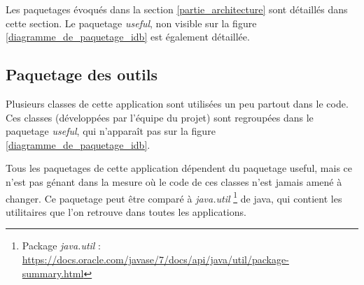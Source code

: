 Les paquetages évoqués dans la section \ref{partie_architecture} sont détaillés dans cette section.
Le paquetage \textit{useful}, non visible sur la figure \ref{diagramme_de_paquetage_idb} est également détaillée.

\subsection{Paquetage des outils}
Plusieurs classes de cette application sont utilisées un peu partout dans le code.
Ces classes (développées par l'équipe du projet) sont regroupées dans le paquetage \textit{useful}, qui n'apparaît pas sur la figure \ref{diagramme_de_paquetage_idb}.

Tous les paquetages de cette application dépendent du paquetage useful, mais ce n'est pas génant dans la mesure où le code de ces classes n'est jamais amené à changer.
Ce paquetage peut être comparé à \textit{java.util}
\footnote{\label{paguetage_java_util}Package \textit{java.util} : \url{https://docs.oracle.com/javase/7/docs/api/java/util/package-summary.html}}
de java, qui contient les utilitaires que l'on retrouve dans toutes les applications.
